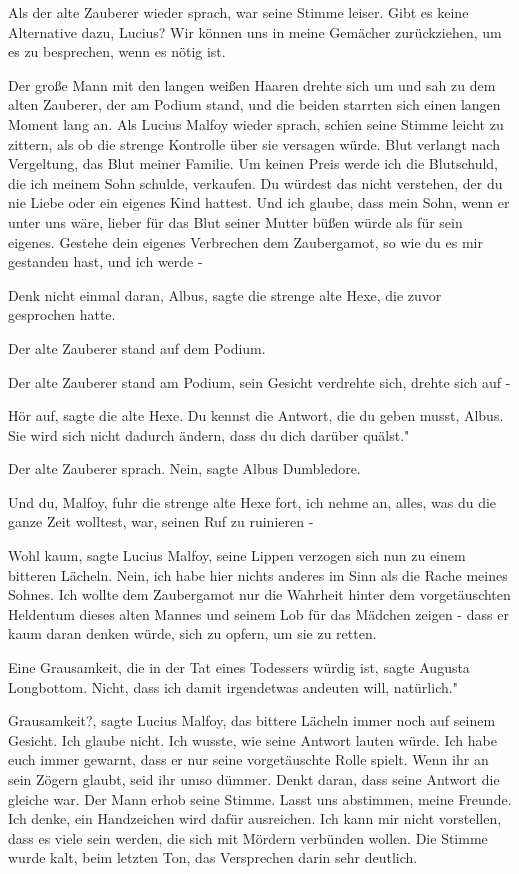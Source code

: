 Als der alte Zauberer wieder sprach, war seine Stimme leiser. \glqq{}Gibt es
keine Alternative dazu, Lucius? Wir können uns in meine Gemächer zurückziehen,
um es zu besprechen, wenn es nötig ist.\grqq{}

Der große Mann mit den langen weißen Haaren drehte sich um und sah zu dem alten
Zauberer, der am Podium stand, und die beiden starrten sich einen langen Moment
lang an. Als Lucius Malfoy wieder sprach, schien seine Stimme leicht zu zittern,
als ob die strenge Kontrolle über sie versagen würde. \glqq{}Blut verlangt nach
Vergeltung, das Blut meiner Familie. Um keinen Preis werde ich die Blutschuld,
die ich meinem Sohn schulde, verkaufen. Du würdest das nicht verstehen, der du
nie Liebe oder ein eigenes Kind hattest. Und ich glaube, dass mein Sohn, wenn er
unter uns wäre, lieber für das Blut seiner Mutter büßen würde als für sein
eigenes. Gestehe dein eigenes Verbrechen dem Zaubergamot, so wie du es mir
gestanden hast, und ich werde -\grqq{}

\glqq{}Denk nicht einmal daran, Albus\grqq{}, sagte die strenge alte Hexe, die
zuvor gesprochen hatte.

Der alte Zauberer stand auf dem Podium.

Der alte Zauberer stand am Podium, sein Gesicht verdrehte sich, drehte sich auf
-

\glqq{}Hör auf\grqq{}, sagte die alte Hexe. \glqq{}Du kennst die Antwort, die du
geben musst, Albus. Sie wird sich nicht dadurch ändern, dass du dich darüber
quälst."

Der alte Zauberer sprach. \glqq{}Nein\grqq{}, sagte Albus Dumbledore.

\glqq{}Und du, Malfoy\grqq{}, fuhr die strenge alte Hexe fort, \glqq{}ich nehme
an, alles, was du die ganze Zeit wolltest, war, seinen Ruf zu ruinieren -\grqq{}

\glqq{}Wohl kaum\grqq{}, sagte Lucius Malfoy, seine Lippen verzogen sich nun zu
einem bitteren Lächeln. \glqq{}Nein, ich habe hier nichts anderes im Sinn als die
Rache meines Sohnes. Ich wollte dem Zaubergamot nur die Wahrheit hinter dem
vorgetäuschten Heldentum dieses alten Mannes und seinem Lob für das Mädchen
zeigen - dass er kaum daran denken würde, sich zu opfern, um sie zu
retten.\grqq{}

\glqq{}Eine Grausamkeit, die in der Tat eines Todessers würdig ist\grqq{}, sagte
Augusta Longbottom. \glqq{}Nicht, dass ich damit irgendetwas andeuten will,
natürlich."

\glqq{}Grausamkeit?\grqq{}, sagte Lucius Malfoy, das bittere Lächeln immer noch
auf seinem Gesicht. \glqq{}Ich glaube nicht. Ich wusste, wie seine Antwort lauten
würde. Ich habe euch immer gewarnt, dass er nur seine vorgetäuschte Rolle
spielt. Wenn ihr an sein Zögern glaubt, seid ihr umso dümmer. Denkt daran, dass
seine Antwort die gleiche war.\grqq{} Der Mann erhob seine Stimme. \glqq{}Lasst
uns abstimmen, meine Freunde. Ich denke, ein Handzeichen wird dafür ausreichen.
Ich kann mir nicht vorstellen, dass es viele sein werden, die sich mit Mördern
verbünden wollen.\grqq{} Die Stimme wurde kalt, beim letzten Ton, das
Versprechen darin sehr deutlich.

